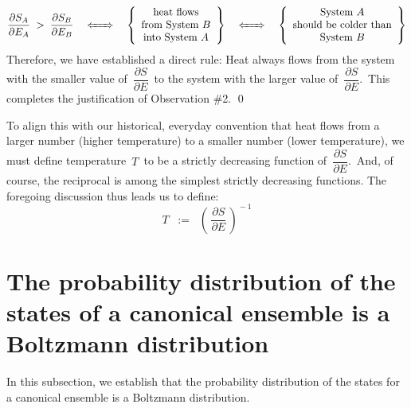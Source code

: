\begin{equation*}
\dfrac{\partial S_{A}}{\partial E_{A}}
\; > \;
    \dfrac{\partial S_{B}}{\partial E_{B}}
\quad
\xLeftrightarrow{{\color{white}......}}
\quad
\left\{\begin{array}{c}
    \textnormal{heat flows}
    \\
    \textnormal{from System $B$}
    \\
    \textnormal{into System $A$}
    \end{array}\right\}
\quad
\xLeftrightarrow{{\color{white}......}}
\quad
\left\{\begin{array}{c}
    \textnormal{System $A$}
    \\
    \textnormal{should be colder than}
    \\
    \textnormal{System $B$}
    \end{array}\right\}
\end{equation*}
Therefore, we have established a direct rule:
Heat always flows from the system with the smaller value of
\,$\dfrac{\partial S}{\partial E}$\,
to the system with the larger value of
\,$\dfrac{\partial S}{\partial E}$.\,
This completes the justification of Observation \#2.
\qed

\vskip 0.7cm
\noindent
To align this with our historical, everyday convention that
heat flows from a larger number (higher temperature)
to a smaller number (lower temperature), we must define
temperature \,$T$\, to be a {\color{red}strictly decreasing} function of
\,$\dfrac{\partial S}{\partial E}$.\,
And, of course, the reciprocal is among the simplest strictly decreasing functions.
The foregoing discussion thus leads us to define:
\begin{equation*}
T
\;\; := \;\;
    \left(\,
        \dfrac{\partial S}{\partial E}
        \,\right)^{\!-1}
\end{equation*}


\vskip 0.5cm
\section{The probability distribution of the states of a canonical ensemble is a Boltzmann distribution}


In this subsection, we establish that the probability distribution of the states
for a canonical ensemble is a Boltzmann distribution.

